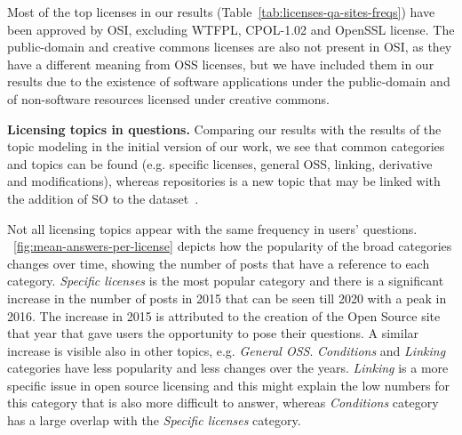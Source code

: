 \documentclass{elsarticle}
\begin{document}
Most of the top licenses in our results (Table~\ref{tab:licenses-qa-sites-freqs}) have been approved by OSI, excluding WTFPL, CPOL-1.02 and OpenSSL license. The public-domain and creative commons licenses are also not present in OSI, as they have a different meaning from OSS licenses, but we have included them in our results due to the existence of software applications under the public-domain and of non-software resources licensed under creative commons. 

\noindent{}

\textbf{Licensing topics in questions.} Comparing our results with the results of the topic modeling in the initial version of our work, we see that common categories and topics can be found (e.g. specific licenses, general OSS, linking, derivative and modifications), whereas repositories is a new topic that may be linked with the addition of SO to the dataset~\cite{kapitsaki2020developers}. 

Not all licensing topics appear with the same frequency in users' questions. \figurename~\ref{fig:mean-answers-per-license} depicts how the popularity of the broad categories changes over time, showing the number of posts that have a reference to each category. \emph{Specific licenses} is the most popular category and there is a significant increase in the number of posts in 2015 that can be seen till 2020 with a peak in 2016. The increase in 2015 is attributed to the creation of the Open Source site that year that gave users the opportunity to pose their questions. A similar increase is visible also in other topics, e.g. \emph{General OSS}. \emph{Conditions} and \emph{Linking} categories have less popularity and less changes over the years. \emph{Linking} is a more specific issue in open source licensing and this might explain the low numbers for this category that is also more difficult to answer, whereas \emph{Conditions} category has a large overlap with the \emph{Specific licenses} category. 
\end{document}
